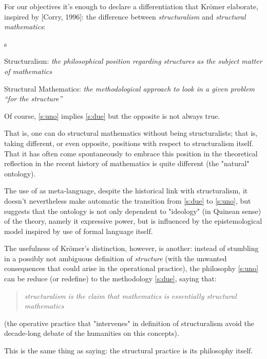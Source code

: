 For our objectives it's enough to declare a differentiation that Kr\"omer elaborate, inspired by [Corry, 1996]: the difference between \emph{structuralism} and \emph{structural mathematics}:
\begin{enumtag}{s}
	\item \label{s:uno} Structuralism: \textit{the philosophical
		      position regarding structures as the subject matter of mathematics}
	\item \label{s:due} Structural Mathematics: \textit{the methodological approach to look in a given problem
		      “for the structure”}
\end{enumtag}
\begin{remark}
	Of course, \ref{s:uno} implies \ref{s:due} but the opposite is not always true.

	That is, one can do structural mathematics without being structuralists; that is, taking different, or even opposite, positions with respect to structuralism itself. That it has often come spontaneously to embrace this position in the theoretical reflection in the recent history of mathematics is quite different (the "natural" ontology).

	The use of  as meta-language, despite the historical link with structuralism, it doesn't nevertheless make automatic the transition from \ref{s:due} to  \ref{s:uno}, but suggests that the ontology is not only dependent to "ideology" (in Quinean sense) of the theory, namely it expressive power, but is influenced by the epistemological model inspired by use of formal language itself.
\end{remark}
The usefulness of Kr\"omer's distinction, however, is another: instead of stumbling in a possibly not ambiguous definition of \textit{structure} (with the unwanted consequences that could arise in the operational practice), the philosophy \ref{s:uno} can be reduce (or redefine) to the methodology \ref{s:due}, saying that:

\begin{quote}
	\emph{structuralism is the claim that mathematics
		is essentially structural mathematics} \cite{kromer2007tool}
\end{quote}

(the operative practice that "intervenes" in definition of structuralism avoid the decade-long debate of the humanities on this concepts).


This is the same thing as saying: the structural practice is its philosophy itself.

